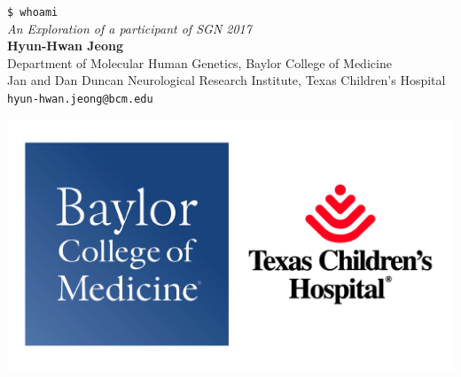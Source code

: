 \documentclass[a0,portrait]{a0poster}
\begin{document}


\begin{minipage}[b]{0.65\linewidth}
\veryHuge \color{NavyBlue} \verb|$ whoami| \color{Black}\\ %
\Huge\textit{An Exploration of a participant of SGN 2017}\\[2cm] %
\huge \textbf{Hyun-Hwan Jeong}\\[0.5cm] %
\Large Department of Molecular Human Genetics, Baylor College of Medicine\\[0.2cm] %
\Large Jan and Dan Duncan Neurological Research Institute, Texas Children's Hospital\\[0.2cm] %
\Large \texttt{hyun-hwan.jeong@bcm.edu} \\
\end{minipage}
%
\begin{minipage}[b]{0.25\linewidth}
\includegraphics[width=20cm]{logo.pdf}\\
\end{minipage}

\vspace{1cm} %

\end{document}
